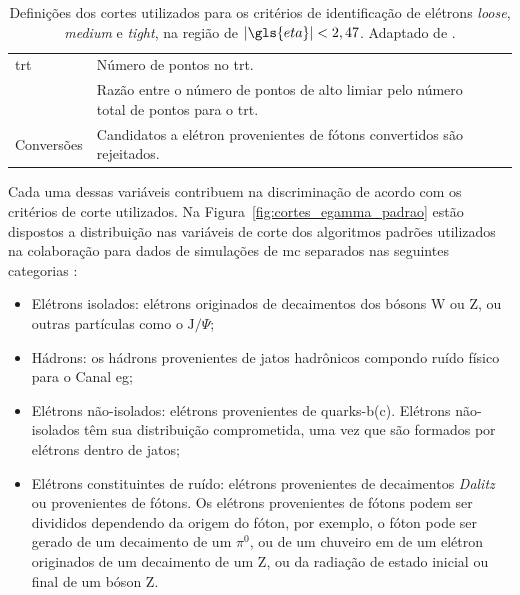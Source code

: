 \begin{table}[p]
{\begin{tabular}{p{4cm}p{9cm}c}
\hline
\gls{trt} & Número de pontos no \gls{trt}. & \\
 & Razão entre o número de pontos de alto limiar pelo número total de pontos para o
\gls{trt}. & \\
\hline
Conversões & Candidatos a elétron provenientes de fótons convertidos são
rejeitados. & \\
\hline
\hline
\end{tabular}
}
\caption[Definições dos cortes utilizados para os critérios de identificação de elétrons \emph{loose}, \emph{medium}
e \emph{tight}, na região de $|\eta|<2,47$]
{Definições dos cortes utilizados para os critérios de identificação de elétrons \emph{loose}, \emph{medium}
e \emph{tight}, na região de $|\gls{eta}|<2,47$. Adaptado de \cite{expected_perf_2011}.}
\label{tab:cortes_em}
\end{table}

Cada uma dessas variáveis contribuem na discriminação de acordo com os critérios
de corte utilizados. Na Figura~\ref{fig:cortes_egamma_padrao} estão dispostos a
distribuição nas variáveis de corte dos algoritmos padrões utilizados na
colaboração para dados de simulações de \gls{mc} separados nas seguintes 
categorias \cite{expected_perf_2011}:

\begin{itemize}
\item Elétrons isolados: elétrons originados de decaimentos dos
bósons W ou Z, ou outras partículas como o $\text{J}/\Psi$;
\item Hádrons: os hádrons provenientes de
jatos hadrônicos compondo ruído físico para o Canal \gls{eg};
\item Elétrons não-isolados: elétrons
provenientes de quarks-b(c). Elétrons não-isolados têm sua distribuição
comprometida, uma vez que são formados por elétrons dentro de jatos;
\item Elétrons constituintes de ruído: elétrons
provenientes de decaimentos \emph{Dalitz} ou provenientes de fótons. Os elétrons
provenientes de fótons podem ser divididos dependendo da origem do fóton, por
exemplo, o fóton pode ser gerado de um decaimento de um $\pi^0$, ou de um
chuveiro \gls{em} de um elétron originados de um decaimento de um Z, ou da
radiação de estado inicial ou final de um bóson Z.
\end{itemize}

